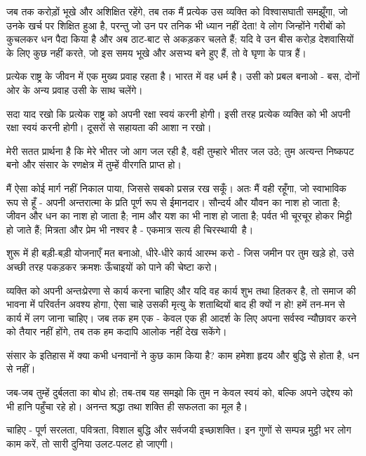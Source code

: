 जब तक करोड़ों भूखे और अशिक्षित रहेंगे, तब तक मैं प्रत्येक उस व्यक्ति को विश्वासघाती समझूँगा, जो उनके खर्च पर शिक्षित हुआ है, परन्तु जो उन पर तनिक भी ध्यान नहीं देता! वे लोग जिन्होंने गरीबों को कुचलकर धन पैदा किया है और अब ठाट-बाट से अकड़कर चलते हैं; यदि वे उन बीस करोड़ देशवासियों के लिए कुछ नहीं करते, जो इस समय भूखे और असभ्य बने हुए हैं, तो वे घृणा के पात्र हैं। 

प्रत्येक राष्ट्र के जीवन में एक मुख्य प्रवाह रहता है। भारत में वह धर्म है। उसी को प्रबल बनाओ - बस, दोनों ओर के अन्य प्रवाह उसी के साथ चलेंगे। 

सदा याद रखो कि प्रत्येक राष्ट्र को अपनी रक्षा स्वयं करनी होगी। इसी तरह प्रत्येक व्यक्ति को भी अपनी रक्षा स्वयं करनी होगी। दूसरों से सहायता की आशा न रखो। 

मेरी सतत प्रार्थना है कि मेरे भीतर जो आग जल रही है, वही तुम्हारे भीतर जल उठे; तुम अत्यन्त निष्कपट बनो और संसार के रणक्षेत्र में तुम्हें वीरगति प्राप्त हो। 

मैं ऐसा कोई मार्ग नहीं निकाल पाया, जिससे सबको प्रसन्न रख सकूँ। अतः मैं वही रहूँगा, जो स्वाभाविक रूप से हूँ - अपनी अन्तरात्मा के प्रति पूर्ण रूप से ईमानदार। सौन्दर्य और यौवन का नाश हो जाता है; जीवन और धन का नाश हो जाता है; नाम और यश का भी नाश हो जाता है; पर्वत भी चूरचूर होकर मिट्टी हो जाते हैं; मित्रता और प्रेम भी नश्वर है - एकमात्र सत्य ही चिरस्थायी~है। 

शुरू में ही बड़ी-बड़ी योजनाएँ मत बनाओ, धीरे-धीरे कार्य आरम्भ करो - जिस जमीन पर तुम खड़े हो, उसे अच्छी तरह पकड़कर क्रमशः ऊँचाइयों को पाने की चेष्टा करो। 

व्यक्ति को अपनी अन्तःप्रेरणा से कार्य करना चाहिए और यदि वह कार्य शुभ तथा हितकर है, तो समाज की भावना में परिवर्तन अवश्य होगा, ऐसा चाहे उसकी मृत्यु के शताब्दियों बाद ही क्यों न हो! हमें तन-मन से कार्य में लग जाना चाहिए। जब तक हम एक - केवल एक ही आदर्श के लिए अपना सर्वस्व न्यौछावर करने को तैयार नहीं होंगे, तब तक हम कदापि आलोक नहीं देख सकेंगे। 

संसार के इतिहास में क्या कभी धनवानों ने कुछ काम किया है? काम हमेशा हृदय और बुद्धि से होता है, धन से नहीं। 

जब-जब तुम्हें दुर्बलता का बोध हो; तब-तब यह समझो कि तुम न केवल स्वयं को, बल्कि अपने उद्देश्य को भी हानि पहुँचा रहे हो। अनन्त श्रद्धा तथा शक्ति ही सफलता का मूल है। 

चाहिए - पूर्ण सरलता, पवित्रता, विशाल बुद्धि और सर्वजयी इच्छाशक्ति। इन गुणों से सम्पन्न मुट्ठी भर लोग काम करें, तो सारी दुनिया उलट-पलट हो जाएगी। 

